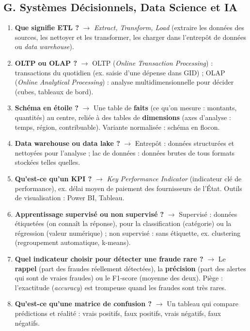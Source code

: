 \subsection*{G. Systèmes Décisionnels, Data Science et IA}
\begin{enumerate}[leftmargin=*]
    \item \textbf{Que signifie ETL ?} $\rightarrow$ \textit{Extract, Transform, Load} (extraire les données des sources, les nettoyer et les transformer, les charger dans l'entrepôt de données ou \textit{data warehouse}).
    \item \textbf{OLTP ou OLAP ?} $\rightarrow$ OLTP (\textit{Online Transaction Processing}) : transactions du quotidien (ex. saisie d'une dépense dans GID) ; OLAP (\textit{Online Analytical Processing}) : analyse multidimensionnelle pour décider (cubes, tableaux de bord).
    \item \textbf{Schéma en étoile ?} $\rightarrow$ Une table de \textbf{faits} (ce qu'on mesure : montants, quantités) au centre, reliée à des tables de \textbf{dimensions} (axes d'analyse : temps, région, contribuable). Variante normalisée : schéma en flocon.
    \item \textbf{Data warehouse ou data lake ?} $\rightarrow$ Entrepôt : données structurées et nettoyées pour l'analyse ; lac de données : données brutes de tous formats stockées telles quelles.
    \item \textbf{Qu'est-ce qu'un KPI ?} $\rightarrow$ \textit{Key Performance Indicator} (indicateur clé de performance), ex. délai moyen de paiement des fournisseurs de l'État. Outils de visualisation : Power BI, Tableau.
    \item \textbf{Apprentissage supervisé ou non supervisé ?} $\rightarrow$ Supervisé : données étiquetées (on connaît la réponse), pour la classification (catégorie) ou la régression (valeur numérique) ; non supervisé : sans étiquette, ex. clustering (regroupement automatique, k-means).
    \item \textbf{Quel indicateur choisir pour détecter une fraude rare ?} $\rightarrow$ Le \textbf{rappel} (part des fraudes réellement détectées), la \textbf{précision} (part des alertes qui sont de vraies fraudes) ou le F1-score (moyenne des deux). Piège : l'exactitude (\textit{accuracy}) est trompeuse quand les fraudes sont très rares.
    \item \textbf{Qu'est-ce qu'une matrice de confusion ?} $\rightarrow$ Un tableau qui compare prédictions et réalité : vrais positifs, faux positifs, vrais négatifs, faux négatifs.

\end{enumerate}
